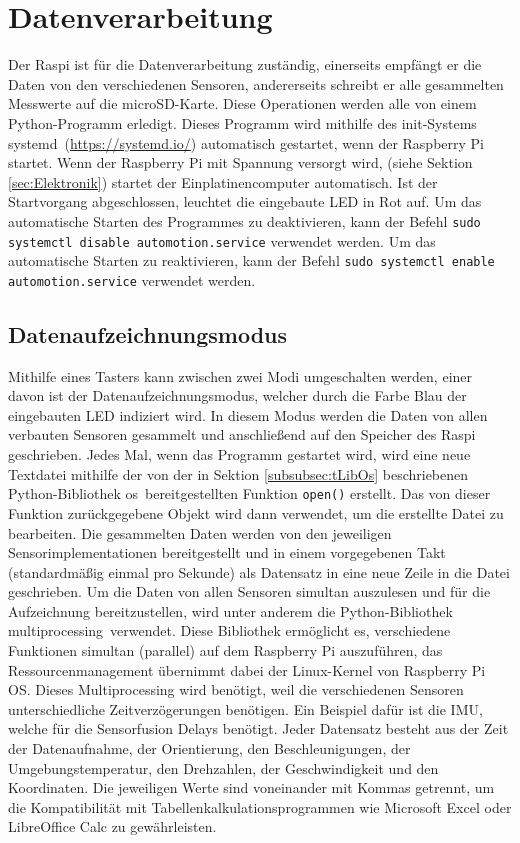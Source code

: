 \section{Datenverarbeitung}
\label{sec:Datenverarbeitung}
Der \ac{Raspi} ist für die Datenverarbeitung zuständig, einerseits empfängt er die Daten von den verschiedenen Sensoren, andererseits schreibt er alle gesammelten Messwerte auf die microSD-Karte. Diese Operationen werden alle von einem Python-Programm erledigt. Dieses Programm wird mithilfe des init-Systems \glqq systemd\grqq\ (\url{https://systemd.io/}) automatisch gestartet, wenn der Raspberry Pi startet. Wenn der Raspberry Pi mit Spannung versorgt wird, (siehe Sektion \ref{sec:Elektronik}) startet der Einplatinencomputer automatisch. Ist der Startvorgang abgeschlossen, leuchtet die eingebaute \ac{LED} in Rot auf. Um das automatische Starten des Programmes zu deaktivieren, kann der Befehl \verb|sudo systemctl disable automotion.service| verwendet werden. Um das automatische Starten zu reaktivieren, kann der Befehl \verb|sudo systemctl enable automotion.service| verwendet werden.
\subsection{Datenaufzeichnungsmodus}
\label{subsec:Datenaufzeichnungsmodus}
Mithilfe eines Tasters kann zwischen zwei Modi umgeschalten werden, einer davon ist der Datenaufzeichnungsmodus, welcher durch die Farbe Blau der eingebauten \ac{LED} indiziert wird. In diesem Modus werden die Daten von allen verbauten Sensoren gesammelt und anschließend auf den Speicher des \ac{Raspi} geschrieben. Jedes Mal, wenn das Programm gestartet wird, wird eine neue Textdatei mithilfe der von der in Sektion \ref{subsubsec:tLibOs} beschriebenen Python-Bibliothek \glqq os\grqq\ bereitgestellten Funktion \verb|open()| erstellt. Das von dieser Funktion zurückgegebene Objekt wird dann verwendet, um die erstellte Datei zu bearbeiten. Die gesammelten Daten werden von den jeweiligen Sensorimplementationen bereitgestellt und in einem vorgegebenen Takt (standardmäßig einmal pro Sekunde) als Datensatz in eine neue Zeile in die Datei geschrieben. Um die Daten von allen Sensoren simultan auszulesen und für die Aufzeichnung bereitzustellen, wird unter anderem die Python-Bibliothek \glqq multiprocessing\grqq\ verwendet. Diese Bibliothek ermöglicht es, verschiedene Funktionen simultan (parallel) auf dem Raspberry Pi auszuführen, das Ressourcenmanagement übernimmt dabei der Linux-Kernel von Raspberry Pi OS. Dieses Multiprocessing wird benötigt, weil die verschiedenen Sensoren unterschiedliche Zeitverzögerungen benötigen. Ein Beispiel dafür ist die \ac{IMU}, welche für die Sensorfusion Delays benötigt. Jeder Datensatz besteht aus der Zeit der Datenaufnahme, der Orientierung, den Beschleunigungen, der Umgebungstemperatur, den Drehzahlen, der Geschwindigkeit und den Koordinaten. Die jeweiligen Werte sind voneinander mit Kommas getrennt, um die Kompatibilität mit Tabellenkalkulationsprogrammen wie Microsoft Excel oder LibreOffice Calc zu gewährleisten.
